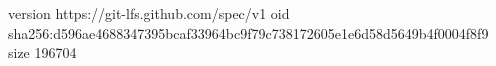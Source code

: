 version https://git-lfs.github.com/spec/v1
oid sha256:d596ae4688347395bcaf33964bc9f79c738172605e1e6d58d5649b4f0004f8f9
size 196704
